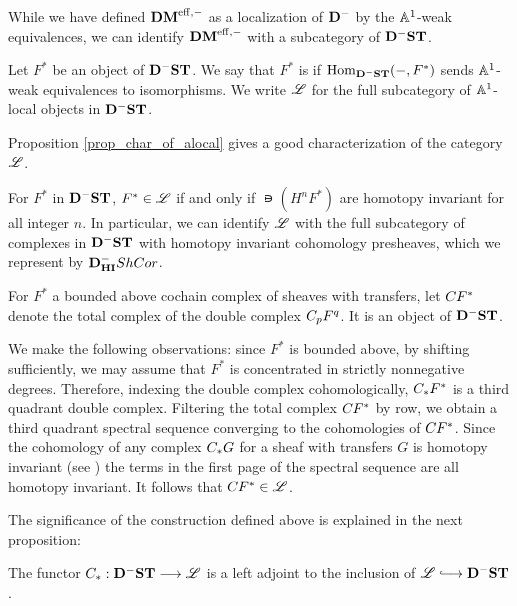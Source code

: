 While we have defined $\DMeff$ as a localization of 
$\DCat^-$ by the $\A^1$-weak equivalences, we can identify
$\DMeff$ with a subcategory of $\DShCor$.

\begin{defn}\label{def_ALocal}
Let $F^*$ be an object of $\DShCor$. We say that $F^*$ is 
 if $\hom_{\DShCor}(-, F^*)$ sends $\A^1$-weak 
equivalences to isomorphisms. We write $\ALocal$ for the full 
subcategory of $\A^1$-local objects in $\DShCor$.
\end{defn}

Proposition \ref{prop_char_of_alocal} gives a good 
characterization of the category $\ALocal$.

\begin{prop}\label{prop_char_of_alocal}
For $F^*$ in $\DShCor$, $F^* \in \ALocal$ if and only if
$\nis(H^n F^*)$ are homotopy invariant for all integer $n$. In 
particular, we can identify $\ALocal$ with the full subcategory of 
complexes in $\DShCor$ with homotopy invariant cohomology 
presheaves, which we represent by $\DCat^-_{\HI} \ShCor$.
\end{prop}

\begin{defn}
For $F^*$ a bounded above cochain complex of sheaves with transfers,
let $\suslC[] F^*$ denote the total complex of the double complex 
$\suslC[p] F^q$. It is an object of 
$\DShCor$.
\end{defn}

We make the following observations: since $F^*$ is bounded above,
by shifting sufficiently, we may assume that $F^*$ is concentrated
in strictly nonnegative degrees. Therefore, indexing the double
complex cohomologically, $\suslC F^*$ is a third quadrant double 
complex. Filtering the total complex $\suslC[] F^*$ by row, we 
obtain a third quadrant spectral sequence converging to the 
cohomologies of $\suslC[] F^*$. Since the cohomology of any complex
$\suslC G$ for a sheaf with transfers $G$ is homotopy invariant 
(see \cite[2.19]{MVW}) the terms in the first page of the spectral 
sequence are all homotopy invariant. It follows that $\suslC[] F^* 
\in \ALocal$.

The significance of the construction defined above is explained
in the next proposition:

\begin{prop}\label{prop_suslC_ALocal}
The functor $\suslC : \DShCor \to \ALocal$ is a left adjoint to
the inclusion of $\ALocal \into \DShCor$.
\end{prop}

